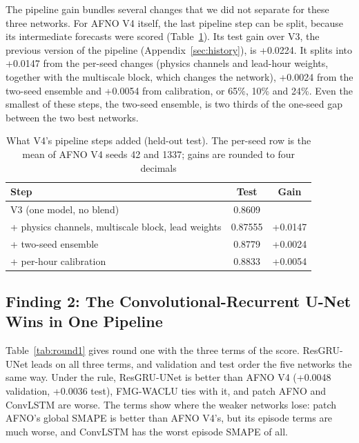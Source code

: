 \documentclass[journal]{IEEEtran}
\begin{document}
The pipeline gain bundles several changes that we did not separate for these three networks. For AFNO V4 itself, the last pipeline step can be split, because its intermediate forecasts were scored (Table~\ref{tab:v4steps}). Its test gain over V3, the previous version of the pipeline (Appendix~\ref{sec:history}), is +0.0224. It splits into +0.0147 from the per-seed changes (physics channels and lead-hour weights, together with the multiscale block, which changes the network), +0.0024 from the two-seed ensemble and +0.0054 from calibration, or 65\%, 10\% and 24\%. Even the smallest of these steps, the two-seed ensemble, is two thirds of the one-seed gap between the two best networks.

\begin{table}[!htb]
\centering
\caption{What V4's pipeline steps added (held-out test). The per-seed row is the mean of AFNO V4 seeds 42 and 1337; gains are rounded to four decimals}
\label{tab:v4steps}
\begin{tabular}{@{}lcc@{}}
\toprule
Step & Test & Gain \\
\midrule
V3 (one model, no blend) & 0.8609 & \\
+ physics channels, multiscale block, lead weights & 0.87555 & +0.0147 \\
+ two-seed ensemble & 0.8779 & +0.0024 \\
+ per-hour calibration & 0.8833 & +0.0054 \\
\bottomrule
\end{tabular}
\end{table}

\subsection{Finding 2: The Convolutional-Recurrent U-Net Wins in One Pipeline}
\label{sec:finding2}
Table~\ref{tab:round1} gives round one with the three terms of the score. ResGRU-UNet leads on all three terms, and validation and test order the five networks the same way. Under the rule, ResGRU-UNet is better than AFNO V4 (+0.0048 validation, +0.0036 test), FMG-WACLU ties with it, and patch AFNO and ConvLSTM are worse. The terms show where the weaker networks lose: patch AFNO's global SMAPE is better than AFNO V4's, but its episode terms are much worse, and ConvLSTM has the worst episode SMAPE of all.
\end{document}
